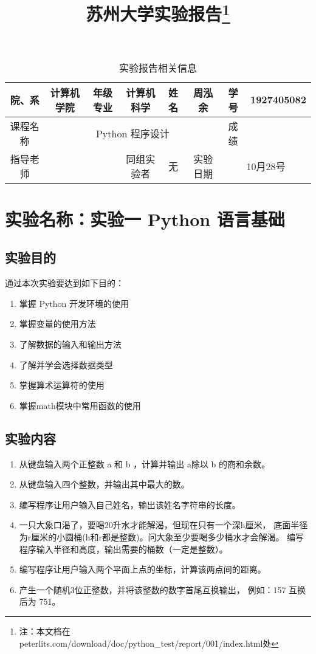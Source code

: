 \documentclass[a4paper]{ctexart}
\title{苏州大学实验报告\footnote{注：本文档在 peterlits.com/download/doc/python\_test/report/001/index.html处}}
\author{}
\begin{document}
   \maketitle

   \begin{table}[!h]
      \centering
      \begin{tabular}{|c|c|c|c|c|c|c|c|}
         \hline
         院、系 & 计算机学院 & 年级专业 & 计算机科学 
         & 姓名 & 周泓余 & 学号 & 1927405082 \\ \hline
         课程名称 & \multicolumn{5}{c|}{Python 程序设计} & 成绩 & \\ \hline
         指导老师 & \multicolumn{2}{c|}{}& 同组实验者 & 无 & 实验日期
         & \multicolumn{2}{c|}{10月28号} \\
         \hline
      \end{tabular}
      \caption{实验报告相关信息}
   \end{table}

   \section*{实验名称：实验一 Python 语言基础}
   \subsection{实验目的}
      通过本次实验要达到如下目的：
      \begin{enumerate}
         \item 掌握 Python 开发环境的使用
         \item 掌握变量的使用方法
         \item 了解数据的输入和输出方法
         \item 了解并学会选择数据类型
         \item 掌握算术运算符的使用
         \item 掌握math模块中常用函数的使用
      \end{enumerate}

   \subsection{实验内容}
      \begin{enumerate}
         \item 从键盘输入两个正整数 a 和 b ，计算并输出 a除以 b 的商和余数。
         \item 从键盘输入四个整数，并输出其中最大的数。
         \item 编写程序让用户输入自己姓名，输出该姓名字符串的长度。
         \item 一只大象口渴了，要喝20升水才能解渴，但现在只有一个深h厘米，%
            底面半径为r厘米的小圆桶(h和r都是整数)。问大象至少要喝多少桶水才会解渴。%
            编写程序输入半径和高度，输出需要的桶数（一定是整数）。
         \item 编写程序让用户输入两个平面上点的坐标，计算该两点间的距离。
         \item 产生一个随机3位正整数，并将该整数的数字首尾互换输出，%
            例如：157 互换后为 751。
      \end{enumerate}
\end{document}
